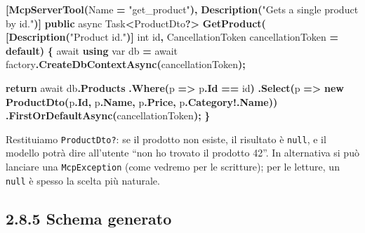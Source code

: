 \documentclass[
  italian,
  10pt,
]{book}
\newenvironment{Shaded}{\begin{snugshade}}{\end{snugshade}}
\newcommand{\DataTypeTok}[1]{\textcolor[rgb]{0.13,0.29,0.53}{#1}}
\newcommand{\FunctionTok}[1]{\textcolor[rgb]{0.13,0.29,0.53}{\textbf{#1}}}
\newcommand{\KeywordTok}[1]{\textcolor[rgb]{0.13,0.29,0.53}{\textbf{#1}}}
\newcommand{\NormalTok}[1]{#1}
\newcommand{\OperatorTok}[1]{\textcolor[rgb]{0.81,0.36,0.00}{\textbf{#1}}}
\newcommand{\StringTok}[1]{\textcolor[rgb]{0.31,0.60,0.02}{#1}}
\begin{document}
\begin{Shaded}
\begin{Highlighting}[]
\OperatorTok{[}\FunctionTok{McpServerTool}\OperatorTok{(}\NormalTok{Name }\OperatorTok{=} \StringTok{"get\_product"}\OperatorTok{),} \FunctionTok{Description}\OperatorTok{(}\StringTok{"Gets a single product by id."}\OperatorTok{)]}
\KeywordTok{public}\NormalTok{ async Task}\OperatorTok{\textless{}}\NormalTok{ProductDto}\OperatorTok{?\textgreater{}} \FunctionTok{GetProduct}\OperatorTok{(}
    \OperatorTok{[}\FunctionTok{Description}\OperatorTok{(}\StringTok{"Product id."}\OperatorTok{)]} \DataTypeTok{int}\NormalTok{ id}\OperatorTok{,}
\NormalTok{    CancellationToken cancellationToken }\OperatorTok{=} \KeywordTok{default}\OperatorTok{)}
\OperatorTok{\{}
\NormalTok{    await }\KeywordTok{using} \DataTypeTok{var}\NormalTok{ db }\OperatorTok{=}\NormalTok{ await factory}\OperatorTok{.}\FunctionTok{CreateDbContextAsync}\OperatorTok{(}\NormalTok{cancellationToken}\OperatorTok{);}

    \KeywordTok{return}\NormalTok{ await db}\OperatorTok{.}\FunctionTok{Products}
        \OperatorTok{.}\FunctionTok{Where}\OperatorTok{(}\NormalTok{p }\OperatorTok{=\textgreater{}}\NormalTok{ p}\OperatorTok{.}\FunctionTok{Id} \OperatorTok{==}\NormalTok{ id}\OperatorTok{)}
        \OperatorTok{.}\FunctionTok{Select}\OperatorTok{(}\NormalTok{p }\OperatorTok{=\textgreater{}} \KeywordTok{new} \FunctionTok{ProductDto}\OperatorTok{(}\NormalTok{p}\OperatorTok{.}\FunctionTok{Id}\OperatorTok{,}\NormalTok{ p}\OperatorTok{.}\FunctionTok{Name}\OperatorTok{,}\NormalTok{ p}\OperatorTok{.}\FunctionTok{Price}\OperatorTok{,}\NormalTok{ p}\OperatorTok{.}\FunctionTok{Category}\OperatorTok{!.}\FunctionTok{Name}\OperatorTok{))}
        \OperatorTok{.}\FunctionTok{FirstOrDefaultAsync}\OperatorTok{(}\NormalTok{cancellationToken}\OperatorTok{);}
\OperatorTok{\}}
\end{Highlighting}
\end{Shaded}

Restituiamo \texttt{ProductDto?}: se il prodotto non esiste, il
risultato è \texttt{null}, e il modello potrà dire all'utente ``non ho
trovato il prodotto 42''. In alternativa si può lanciare una
\texttt{McpException} (come vedremo per le scritture); per le letture,
un \texttt{null} è spesso la scelta più naturale.

\subsection{2.8.5 Schema generato}\label{schema-generato}
\end{document}
